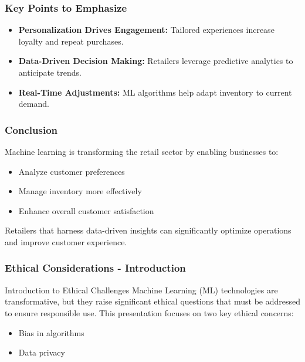\documentclass[aspectratio=169]{beamer}
\begin{document}
\begin{frame}[fragile]
    \frametitle{Key Points to Emphasize}
    \begin{itemize}
        \item \textbf{Personalization Drives Engagement:} Tailored experiences increase loyalty and repeat purchases.
        \item \textbf{Data-Driven Decision Making:} Retailers leverage predictive analytics to anticipate trends.
        \item \textbf{Real-Time Adjustments:} ML algorithms help adapt inventory to current demand.
    \end{itemize}
\end{frame}

\begin{frame}[fragile]
    \frametitle{Conclusion}
    \begin{block}{}
        Machine learning is transforming the retail sector by enabling businesses to:
        \begin{itemize}
            \item Analyze customer preferences
            \item Manage inventory more effectively
            \item Enhance overall customer satisfaction
        \end{itemize}
        Retailers that harness data-driven insights can significantly optimize operations and improve customer experience.
    \end{block}
\end{frame}

\begin{frame}[fragile]
    \frametitle{Ethical Considerations - Introduction}
    \begin{block}{Introduction to Ethical Challenges}
        Machine Learning (ML) technologies are transformative, but they raise significant ethical questions that must be addressed to ensure responsible use. 
        This presentation focuses on two key ethical concerns:
        \begin{itemize}
            \item Bias in algorithms
            \item Data privacy
        \end{itemize}
    \end{block}
\end{frame}
\end{document}
